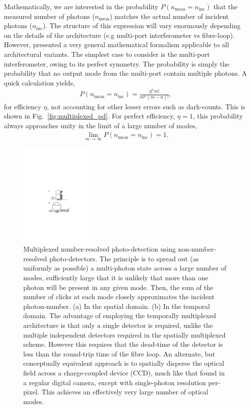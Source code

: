 Mathematically, we are interested in the probability \mbox{$P(n_\mathrm{meas}=n_\mathrm{inc})$} that the measured number of photons ($n_\mathrm{meas}$) matches the actual number of incident photons ($n_\mathrm{inc}$). The structure of this expression will vary enormously depending on the details of the architecture (e.g multi-port interferometer vs fibre-loop). However, \cite{rohdeHuntington} presented a very general mathematical formalism applicable to all architectural variants. The simplest case to consider is the multi-port interferometer, owing to its perfect symmetry. The probability is simply the probability that no output mode from the multi-port contain multiple photons. A quick calculation yields,
\begin{align}
	P(n_\mathrm{meas}=n_\mathrm{inc}) = \frac{\eta^n m!}{m^n(m-n)!},
\end{align}
for efficiency $\eta$, not accounting for other lesser errors such as dark-counts. This is shown in Fig.~\ref{fig:multiplexed_pd}. For perfect efficiency, \mbox{$\eta=1$}, this probability always approaches unity in the limit of a large number of modes,
\begin{align}
\lim_{m\to\infty}P(n_\mathrm{meas}=n_\mathrm{inc})=1.
\end{align}

\begin{figure}[htpb]
\includegraphics[width=0.35\textwidth]{detector_multiplexing}
\caption{Multiplexed number-resolved photo-detection using non-number-resolved photo-detectors. The principle is to spread out (as uniformly as possible) a multi-photon state across a large number of modes, sufficiently large that it is unlikely that more than one photon will be present in any given mode. Then, the sum of the number of clicks at each mode closely approximates the incident photon-number. (a) In the spatial domain. (b) In the temporal domain. The advantage of employing the temporally multiplexed architecture is that only a single detector is required, unlike the multiple independent detectors required in the spatially multiplexed scheme. However this requires that the dead-time of the detector is less than the round-trip time of the fibre loop. An alternate, but conceptually equivalent approach is to spatially disperse the optical field across a charge-coupled device (CCD), much like that found in a regular digital camera, except with single-photon resolution per-pixel. This achieves an effectively very large number of optical modes.} \label{fig:det_mult}
\end{figure}

